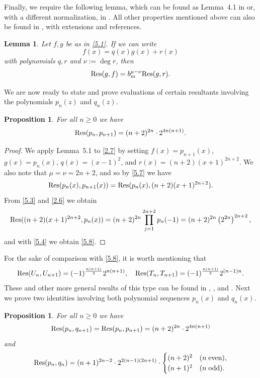 \documentclass{amsart}
\theoremstyle{plain}
\newtheorem{proposition}[theorem]{Proposition}
\newtheorem{lemma}[theorem]{Lemma}
\numberwithin{equation}{section}
\begin{document}
Finally, we require the following lemma, which can be found as Lemma~4.1 in
\cite{DS} or, with a different normalization, in \cite[p.~58]{PZ}. All other
properties mentioned above can also be found in \cite{DS}, with extensions and
references.

\begin{lemma}\label{lem:5.1}
Let $f, g$ be as in \eqref{5.1}. If we can write
\[
f(x) = q(x)g(x) + r(x)
\]
with polynomials $q, r$ and $\nu:=\deg{r}$, then
\begin{equation}\label{5.7}
{\rm Res}(g,f) = b_m^{\mu-\nu}{\rm Res}(g,r).
\end{equation}
\end{lemma}

We are now ready to state and prove evaluations of certain resultants 
involving the polynomials $p_n(z)$ and $q_n(z)$.

\begin{proposition}\label{prop:5.2}
For all $n\geq 0$ we have
\begin{equation}\label{5.8}
{\rm Res}(p_n, p_{n+1}) = (n+2)^{2n}\cdot 2^{4n(n+1)}.
\end{equation}
\end{proposition}

\begin{proof} 
We apply Lemma~5.1 to \eqref{2.7} by setting $f(x)=p_{n+1}(x)$, $g(x)=p_n(x)$,
$q(x)=(x-1)^2$, and $r(x)=(n+2)(x+1)^{2n+2}$. We also note that $\mu=\nu=2n+2$,
and so by \eqref{5.7} we have
\[
{\rm Res}(p_n(x), p_{n+1}(x)) = {\rm Res}(p_n(x), (n+2)(x+1)^{2n+2}).
\]
From \eqref{5.3} and \eqref{2.6} we obtain
\[
{\rm Res}((n+2)(x+1)^{2n+2},p_n(x))
=(n+2)^{2n}\prod_{j=1}^{2n+2}p_n(-1) = (n+2)^{2n}\left(2^{2n}\right)^{2n+2},
\]
and with \eqref{5.4} we obtain \eqref{5.8}. 
\end{proof}

For the sake of comparison with \eqref{5.8}, it is worth mentioning that
\[
{\rm Res}(U_n, U_{n+1})=(-1)^\frac{n(n+1)}{2} 2^{n(n+1)},\quad
{\rm Res}(T_n, T_{n+1})=(-1)^\frac{n(n+1)}{2} 2^{(n-1)n}.
\]
These and other more general results of this type can be found in \cite{JRT},
\cite{Lo}, and \cite{Ya}. Next we prove two identities involving both 
polynomial sequences $p_n(x)$ and $q_n(x)$.

\begin{proposition}\label{prop:5.3}
For all $n\geq 0$ we have
\begin{equation}\label{5.10}
{\rm Res}(p_n, q_{n+1}) = {\rm Res}(p_n, p_{n+1}) = (n+2)^{2n}\cdot 2^{4n(n+1)}
\end{equation}
and
\begin{equation}\label{5.11}
{\rm Res}(p_n, q_n) = (n+1)^{2n-2}\cdot 2^{2(n-1)(2n+1)}\cdot
\begin{cases}
(n+2)^2 & (n\; \hbox{even}),\\
(n+1)^2 & (n\; \hbox{odd}).
\end{cases}
\end{equation}
\end{proposition}
\end{document}
